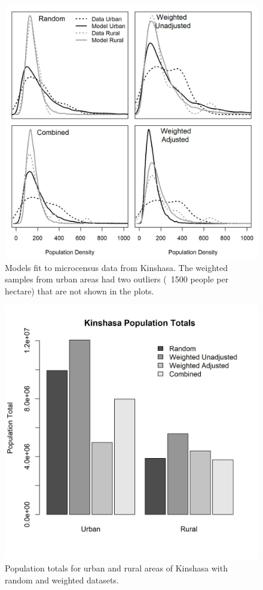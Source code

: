 \documentclass[9pt,twocolumn,twoside,lineno]{pnas-new}
\begin{document}
\begin{figure}
	\centering
	\includegraphics[width=1\linewidth]{drc_model.jpg}
	\caption{Models fit to microcensus data from Kinshasa. The weighted samples from urban areas had two outliers (~1500 people per hectare) that are not shown in the plots.}
	\label{fig:drc_model}
\end{figure}

\begin{figure}
	\centering
	\includegraphics[width=1\linewidth]{drc_totals.jpg}
	\caption{Population totals for urban and rural areas of Kinshasa with random and weighted datasets.}
	\label{fig:drc_totals}
\end{figure}
\end{document}
